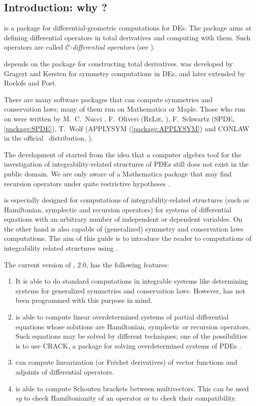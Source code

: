 \subsection{Introduction: why \cde?}
\label{cdesec:why-cde}

\cde is a \REDUCE package for differential-geometric computations for DEs. The
package aims at defining differential operators in total derivatives and
computing with them. Such operators are called \emph{$\mathcal{C}$-differential
  operators} (see \cite{Krasilshchik:99}).

\cde depends on the \REDUCE package \cdiff for constructing total
derivatives. \cdiff was developed by Gragert and Kersten for symmetry
computations in DEs, and later extended by Roelofs and Post.

There are many software packages that can compute symmetries and conservation
laws; many of them run on Mathematica or Maple. Those who run on \REDUCE were
written by M.~C.~Nucci \cite{Nucci:92,Nucci:96}, F.~Oliveri (\textsc{ReLie},
\cite{Oliveri:ReLie}), F.~Schwartz (SPDE, \ref{package:SPDE}), T.~Wolf
(APPLYSYM (\ref{package:APPLYSYM}) and CONLAW in the official \REDUCE\ distribution,
\cite{Wolf:99d,Wolf:APPLYSYM,Brand:95,Brand:92}).

The development of \cde started from the idea that a computer algebra tool
for the investigation of integrability-related structures of PDEs still does
not exist in the public domain. We are only aware of a Mathematica package that
may find recursion operators under quite restrictive hypotheses \cite{BaldwinHereman:2010}.

\cde is especially designed for computations of integrability-related
structures (such as Hamiltonian, symplectic and recursion operators) for
systems of differential equations with an arbitrary number of independent or
dependent variables. On the other hand \cde is also capable of (generalized)
symmetry and conservation laws computations.  The aim of this guide is to
introduce the reader to computations of integrability related structures using
\cde.

The current version of \cde, 2.0, has the following features:
\begin{enumerate}
\item It is able to do standard computations in integrable systems like
  determining systems for generalized symmetries and conservation
  laws. However, \cde has not been programmed with this purpose in mind.
\item \cde is able to compute linear overdetermined systems of partial
  differential equations whose solutions are Hamiltonian, symplectic or
  recursion operators. Such equations may be solved by different techniques;
  one of the possibilities is to use CRACK, a \REDUCE package for solving
  overdetermined systems of PDEs \cite{WolfBrand:CRACK}.
\item \cde can compute linearization (or Fr\'echet derivatives) of vector
  functions and adjoints of differential operators.
\item \cde is able to compute Schouten brackets between multivectors. This can
  be used \emph{eg} to check Hamiltonianity of an operator or to check their
  compatibility.
\end{enumerate}

